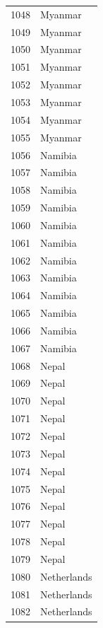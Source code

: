 \documentclass[
  letterpaper,
  DIV=11,
  numbers=noendperiod]{scrreprt}
\begin{document}
\begin{tabular}{ll}
1048 &                   Myanmar \\
1049 &                   Myanmar \\
1050 &                   Myanmar \\
1051 &                   Myanmar \\
1052 &                   Myanmar \\
1053 &                   Myanmar \\
1054 &                   Myanmar \\
1055 &                   Myanmar \\
1056 &                   Namibia \\
1057 &                   Namibia \\
1058 &                   Namibia \\
1059 &                   Namibia \\
1060 &                   Namibia \\
1061 &                   Namibia \\
1062 &                   Namibia \\
1063 &                   Namibia \\
1064 &                   Namibia \\
1065 &                   Namibia \\
1066 &                   Namibia \\
1067 &                   Namibia \\
1068 &                     Nepal \\
1069 &                     Nepal \\
1070 &                     Nepal \\
1071 &                     Nepal \\
1072 &                     Nepal \\
1073 &                     Nepal \\
1074 &                     Nepal \\
1075 &                     Nepal \\
1076 &                     Nepal \\
1077 &                     Nepal \\
1078 &                     Nepal \\
1079 &                     Nepal \\
1080 &               Netherlands \\
1081 &               Netherlands \\
1082 &               Netherlands \\

\end{tabular}
\end{document}
